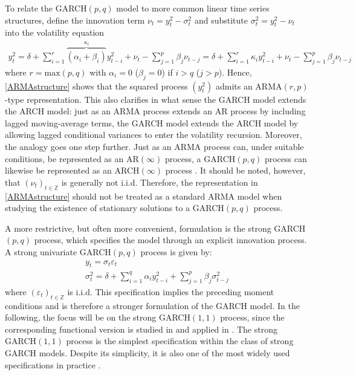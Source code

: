 \documentclass[12pt,a4paper]{article}
\theoremstyle{definition}
\begin{document}
To relate the GARCH$(p,q)$ model to more common linear time series structures, define the innovation term $\nu_t=y_t^2-\sigma_t^2$ and substitute $\sigma_t^2=y_t^2-\nu_t$ into the volatility equation
\begin{align}
\label{ARMAstructure}
    y_t^2=\delta+\sum_{i=1}^r\overbrace{(\alpha_i+\beta_i)}^{\text{$\kappa_i$}}y_{t-i}^2+\nu_t-\sum_{j=1}^p\beta_j\nu_{t-j}=\delta+\sum_{i=1}^r\kappa_iy_{t-i}^2+\nu_t-\sum_{j=1}^p\beta_j\nu_{t-j}
\end{align}
where $r=\mathrm{max}(p,q)$ with $\alpha_i=0$ ($\beta_j=0$) if $i>q$ ($j>p$). Hence, \cref{ARMAstructure} shows that the squared process $(y_t^2)$ admits an ARMA$(r,p)$-type representation. This also clarifies in what sense the GARCH model extends the ARCH model: just as an ARMA process extends an AR process by including lagged moving-average terms, the GARCH model extends the ARCH model by allowing lagged conditional variances to enter the volatility recursion. Moreover, the analogy goes one step further. Just as an ARMA process can, under suitable conditions, be represented as an AR$(\infty)$ process, a GARCH$(p,q)$ process can likewise be represented as an ARCH$(\infty)$ process \citep{francq2019garch}. It should be noted, however, that $(\nu_t)_{t\in\mathbb{Z}}$ is generally not i.i.d. Therefore, the representation in \cref{ARMAstructure} should not be treated as a standard ARMA model when studying the existence of stationary solutions to a GARCH$(p,q)$ process.

A more restrictive, but often more convenient, formulation is the strong GARCH$(p,q)$ process, which specifies the model through an explicit innovation process. A strong univariate GARCH$(p,q)$ process is given by:
\begin{gather}
    y_t = \sigma_t\varepsilon_t \\
    \sigma_t^2 = \delta + \sum_{i=1}^q \alpha_i y_{t-i}^2 + \sum_{j=1}^p \beta_j \sigma_{t-j}^2
    \label{Eq2StrongGARCH}
\end{gather}
where $(\varepsilon_t)_{t\in\mathbb{Z}}$ is $\mathrm{i.i.d.}$ This specification implies the preceding moment conditions and is therefore a stronger formulation of the GARCH model. In the following, the focus will be on the strong GARCH$(1,1)$ process, since the corresponding functional version is studied in \citet{Aue2017} and applied in \citet{RICE20201023}. The strong GARCH$(1,1)$ process is the simplest specification within the class of strong GARCH models. Despite its simplicity, it is also one of the most widely used specifications in practice \citep{Zivot2009}.
\end{document}

